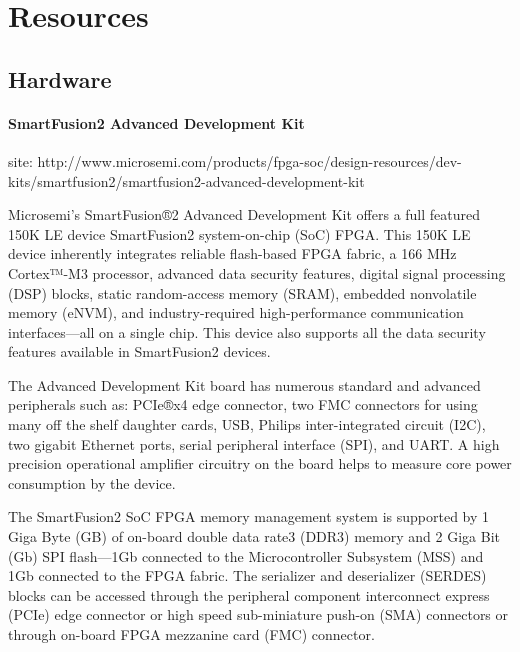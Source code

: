 \documentclass{report}
\begin{document}
	\section{Resources}

		\subsection{Hardware}

			\paragraph{SmartFusion2 Advanced Development Kit}
			
			site: http://www.microsemi.com/products/fpga-soc/design-resources/dev-kits/smartfusion2/smartfusion2-advanced-development-kit
			
			\par Microsemi's SmartFusion®2 Advanced Development Kit offers a full featured 150K LE device SmartFusion2 system-on-chip (SoC) FPGA. This 150K LE device inherently integrates reliable flash-based FPGA fabric, a 166 MHz Cortex™-M3 processor, advanced data security features, digital signal processing (DSP) blocks, static random-access memory (SRAM), embedded nonvolatile memory (eNVM), and industry-required high-performance communication interfaces—all on a single chip. This device also supports all the data security features available in SmartFusion2 devices.
			
			\par The Advanced Development Kit board has numerous standard and advanced peripherals such as: PCIe®x4 edge connector, two FMC connectors for using many off the shelf daughter cards, USB, Philips inter-integrated circuit (I2C), two gigabit Ethernet ports, serial peripheral interface (SPI), and UART. A high precision operational amplifier circuitry on the board helps to measure core power consumption by the device.
			
			\par The SmartFusion2 SoC FPGA memory management system is supported by 1 Giga Byte (GB) of on-board double data rate3 (DDR3) memory and 2 Giga Bit (Gb) SPI flash—1Gb connected to the Microcontroller Subsystem (MSS) and 1Gb connected to the FPGA fabric. The serializer and deserializer (SERDES) blocks can be accessed through the peripheral component interconnect express (PCIe) edge connector or high speed sub-miniature push-on (SMA) connectors or through on-board FPGA mezzanine card (FMC) connector.
			
\end{document}
